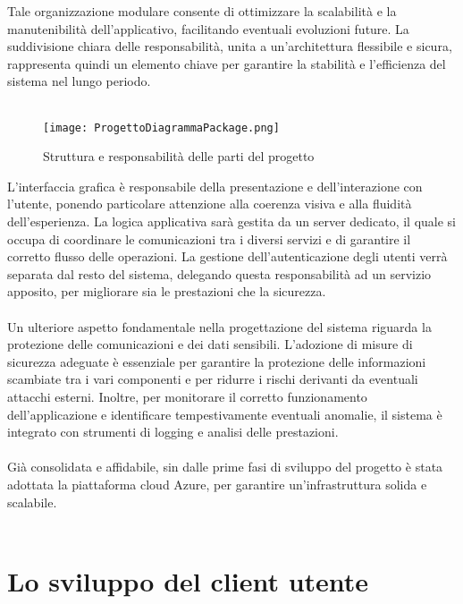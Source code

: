 Tale organizzazione modulare consente di ottimizzare la scalabilità e la manutenibilità dell’applicativo,
facilitando eventuali evoluzioni future.
La suddivisione chiara delle responsabilità, unita a un’architettura flessibile e sicura,
rappresenta quindi un elemento chiave per garantire la stabilità e l’efficienza del sistema nel lungo periodo.\\
\\
\begin{figure}[htb]
    \centering
    \texttt{[image: ProgettoDiagrammaPackage.png]}
    \caption{Struttura e responsabilità delle parti del progetto}
\end{figure}
\clearpage
L'interfaccia grafica è responsabile della presentazione e dell’interazione con l’utente, 
ponendo particolare attenzione alla coerenza visiva e alla fluidità dell’esperienza.
La logica applicativa sarà gestita da un server dedicato, 
il quale si occupa di coordinare le comunicazioni tra i diversi servizi
e di garantire il corretto flusso delle operazioni.
La gestione dell’autenticazione degli utenti verrà separata dal resto del sistema, 
delegando questa responsabilità ad un servizio apposito,
per migliorare sia le prestazioni che la sicurezza.\\
\\
Un ulteriore aspetto fondamentale nella progettazione del sistema riguarda 
la protezione delle comunicazioni e dei dati sensibili.
L’adozione di misure di sicurezza adeguate è essenziale per garantire la protezione delle informazioni scambiate tra i vari componenti e
per ridurre i rischi derivanti da eventuali attacchi esterni.
Inoltre, per monitorare il corretto funzionamento dell’applicazione e 
identificare tempestivamente eventuali anomalie,
il sistema è integrato con strumenti di logging e analisi delle prestazioni.\\
\\
Già consolidata e affidabile, sin dalle prime fasi di sviluppo del progetto è stata adottata la piattaforma cloud Azure, per garantire un'infrastruttura solida e scalabile.\\
\\

\section{Lo sviluppo del client utente}

